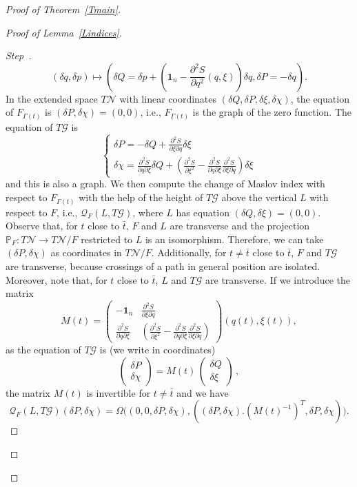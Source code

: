 \documentclass[AHL, Unicode, longabstracts, published]{cedram}
\newcommand*\cq{\mathcal{Q}}
\newcommand*\cg{\mathcal{G}}
\newcommand*\cN{\mathcal{N}}
\newcommand*\cal{\mathcal}
\newcommand{\bfone}{\mathbf{1}}
\newcommand{\bbP}{\mathbb{P}}
\newcounter{stepcount}
\newenvironment{step}{\refstepcounter{stepcount}\begin{proof}[Step~\thestepcount]}{\let\qed\relax\end{proof}}
\begin{document}
\begin{proof}[Proof of Theorem~\ref{Tmain}]
\begin{proof}[Proof of Lemma~\ref{Lindices}]
\begin{step}
\[
(\delta q, \delta p)\mapsto \left(\delta Q=\delta p+\left(\bfone_n-\frac{\partial^2 S}{\partial q^2}(q, \xi)\right)\delta q, \delta P=-\delta q\right).
\]
In the extended space $T\cN$ with linear coordinates $(\delta Q, \delta P, \delta \xi, \delta \chi)$, the equation of $F_{\Gamma(t)}$ is $(\delta P, \delta\chi)=(0, 0)$, i.e., $F_{\Gamma(t)}$ is the graph of the zero function. The equation of $T\cg$ is
\begin{equation}\label{ETG}
\begin{cases}\delta P=-\delta Q+\frac{\partial^2S}{\partial \xi\partial q}\delta \xi\\
\delta \chi=\frac{\partial^2 S}{\partial q\partial \xi} \delta Q+\left(\frac{\partial ^2S}{\partial \xi^2} -\frac{\partial^2 S}{\partial q\partial \xi} \frac{\partial^2S}{\partial\xi\partial q} \right)\delta \xi
\end{cases}
\end{equation}
and this is also a graph. We then compute the change of Maslov index with respect to $F_{\Gamma(t)}$ with the help of the height of $T\cg$ above the vertical $L$ with respect to $F$, {i.e., $\cal Q_F(L,T\cg)$,} where $L$ has equation $(\delta Q, \delta\xi)=(0, 0)$. {Observe that, for $t$ close to $\bar t$}, $F$ and $L$ are transverse and the projection $\bbP_F:T\cN \rightarrow T\cN/F$ restricted to $L$ is an isomorphism. Therefore, we can take $(\delta P, \delta \chi)$ as coordinates in $T\cN/F$. Additionally, for $t\not=\bar t$ close to $\bar t$, $F$ and $T\cg$ are transverse, because crossings of a path in general position are isolated. Moreover, note that, for $t$ close to $\bar t$, $L$ and $T\cg$ are transverse. If we introduce the matrix
\begin{equation}
M(t)=
\begin{pmatrix} -\bfone_n & \frac{\partial^2 S}{\partial\xi\partial q}\\
\frac{\partial^2 S}{\partial q\partial \xi} & \left(\frac{\partial ^2S}{\partial \xi^2}-\frac{\partial^2 S}{\partial q\partial \xi}\frac{\partial^2S}{\partial\xi\partial q}\right)
\end{pmatrix}(q(t), \xi(t)),
\end{equation}
as the equation of $T\cg$ is (we write in coordinates)
\[
\begin{pmatrix}
\delta P \\ \delta \chi
\end{pmatrix} = M(t)\,
\begin{pmatrix}
\delta Q \\ \delta \xi
\end{pmatrix}\,,
\]
the matrix $M(t)$ is invertible for $t\not=\bar t$ and we have
\[
\cq_F(L, T\cg)(\delta P, \delta\chi)=\Omega\Big((0,0,\delta P, \delta \chi), \left((\delta P,\delta\chi).\left(M(t)^{-1}\right)^T, \delta P, \delta\chi\right)\Big).
\]


\end{step}
\end{proof}
\end{proof}
\end{document}
